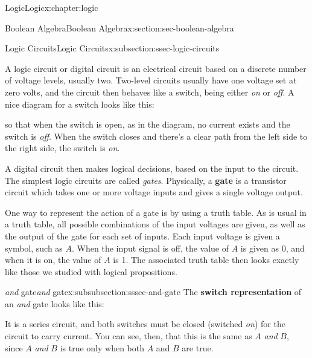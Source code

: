 \documentclass[twoside,10pt,]{book}
\newcommand{\terminology}[1]{\textbf{#1}}
\numberwithin{equation}{section}
\begin{document}
\begin{chapterptx}{Logic}{}{Logic}{}{}{x:chapter:logic}
\begin{sectionptx}{Boolean Algebra}{}{Boolean Algebra}{}{}{x:section:sec-boolean-algebra}
\begin{subsectionptx}{Logic Circuits}{}{Logic Circuits}{}{}{x:subsection:ssec-logic-circuits}
\begin{introduction}{}
A logic circuit or digital circuit is an electrical circuit based on a discrete number of voltage levels, usually two.  Two-level circuits usually have one voltage set at zero volts, and the circuit then behaves like a switch, being either \emph{on} or \emph{off}.  A nice diagram for a switch looks like this: \begin{image}{0.35}{0.3}{0.35}%
%
\end{image}%
 so that when the switch is open, as in the diagram, no current exists and the switch is \emph{off}.  When the switch closes and there's a clear path from the left side to the right side, the switch is \emph{on}.%
\par
A digital circuit then makes logical decisions, based on the input to the circuit.  The simplest logic circuits are called \emph{gates}.  Physically, a \terminology{gate} is a transistor circuit which takes one or more voltage inputs and gives a single voltage output.%
\par
One way to represent the action of a gate is by using a truth table.  As is usual in a truth table, all possible combinations of the input voltages are given, as well as the output of the gate for each set of inputs.  Each input voltage is given a symbol, such as \(A\).  When the input signal is off, the value of \(A\) is given as 0, and when it is on, the value of \(A\) is 1.  The associated truth table then looks exactly like those we studied with logical propositions.%
\end{introduction}%
%
%
\typeout{************************************************}
\typeout{************************************************}
%
\begin{subsubsectionptx}{\emph{and} gate}{}{\emph{and} gate}{}{}{x:subsubsection:sssec-and-gate}
The \terminology{switch representation} of an \emph{and} gate looks like this:  \begin{image}{0.35}{0.3}{0.35}%
%
\end{image}%
 It is a series circuit, and both switches must be closed (switched \emph{on}) for the circuit to carry current.  You can see, then, that this is the same as \(A\) \emph{and} \(B\), since \(A\) \emph{and} \(B\) is true only when both \(A\) and \(B\) are true.%

\end{subsubsectionptx}
\end{subsectionptx}
\end{sectionptx}
\end{chapterptx}
\end{document}
